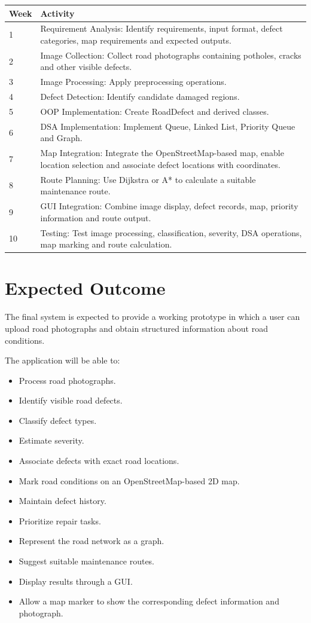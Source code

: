 \documentclass[12pt,a4paper]{article}
\begin{document}
\begin{longtable}{p{} p{}}
\toprule
\textbf{Week} & \textbf{Activity} \\
\midrule
1 & Requirement Analysis: Identify requirements, input format, defect categories, map requirements and expected outputs. \\
2 & Image Collection: Collect road photographs containing potholes, cracks and other visible defects. \\
3 & Image Processing: Apply preprocessing operations. \\
4 & Defect Detection: Identify candidate damaged regions. \\
5 & OOP Implementation: Create RoadDefect and derived classes. \\
6 & DSA Implementation: Implement Queue, Linked List, Priority Queue and Graph. \\
7 & Map Integration: Integrate the OpenStreetMap-based map, enable location selection and associate defect locations with coordinates. \\
8 & Route Planning: Use Dijkstra or A* to calculate a suitable maintenance route. \\
9 & GUI Integration: Combine image display, defect records, map, priority information and route output. \\
10 & Testing: Test image processing, classification, severity, DSA operations, map marking and route calculation. \\
\bottomrule
\end{longtable}

\section{Expected Outcome}

The final system is expected to provide a working prototype in which a user can upload road photographs and obtain structured information about road conditions.

The application will be able to:
\begin{itemize}[leftmargin=*]
    \item Process road photographs.
    \item Identify visible road defects.
    \item Classify defect types.
    \item Estimate severity.
    \item Associate defects with exact road locations.
    \item Mark road conditions on an OpenStreetMap-based 2D map.
    \item Maintain defect history.
    \item Prioritize repair tasks.
    \item Represent the road network as a graph.
    \item Suggest suitable maintenance routes.
    \item Display results through a GUI.
    \item Allow a map marker to show the corresponding defect information and photograph.
\end{itemize}
\end{document}
